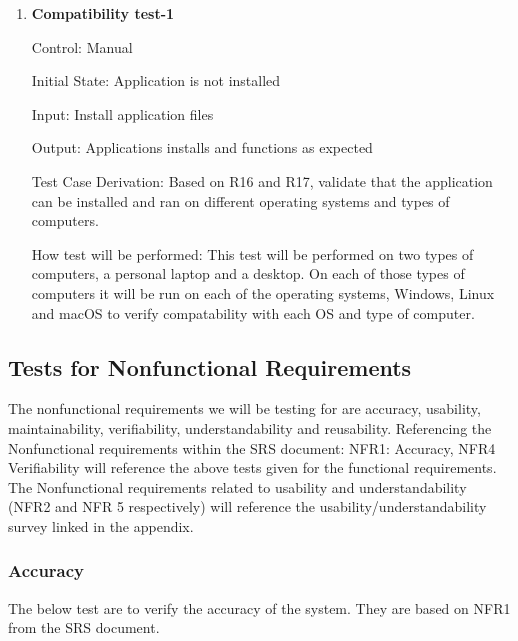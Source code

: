 \documentclass[12pt, titlepage]{article}
\begin{document}
  \begin{enumerate}
    \item {} \hypertarget{Compatibility test-1}{\textbf{Compatibility test-1}} \label{Compatability test-1}
  
  Control: Manual
            
  Initial State: Application is not installed
            
  Input: Install application files
            
  Output: Applications installs and functions as expected
  
  Test Case Derivation: Based on R16 and R17, validate that the application can be installed and ran on different operating systems and types of computers. 
  
  How test will be performed: This test will be performed on two types of computers, a personal laptop and a desktop. On each of those types of computers it will be run on each of the operating systems, Windows, Linux and macOS to verify compatability with each OS and type of computer.

  \end{enumerate}

\subsection{Tests for Nonfunctional Requirements}

\noindent The nonfunctional requirements we will be testing for are accuracy, usability, maintainability, verifiability, understandability and reusability. 
Referencing the Nonfunctional requirements within the SRS document: NFR1: Accuracy, NFR4 Verifiability will reference the above tests given for the functional requirements. 
The Nonfunctional requirements related to usability and understandability (NFR2 and NFR 5 respectively) will reference the usability/understandability survey linked in the appendix.

\subsubsection{Accuracy}

The below test are to verify the accuracy of the system.
They are based on NFR1 from the SRS document.
\end{document}
